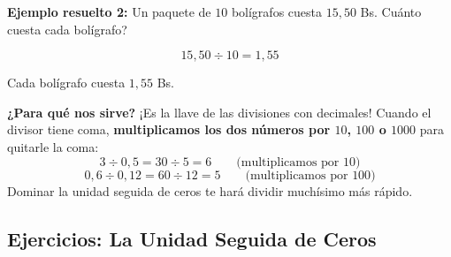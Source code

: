 \documentclass[12pt, letterpaper]{article}
\begin{document}
\noindent\textbf{Ejemplo resuelto 2:} Un paquete de $10$ bolígrafos cuesta $15{,}50$ Bs. \textquestiondown Cuánto cuesta cada bolígrafo?

\[
  15{,}50 \div 10 = 1{,}55
\]

\noindent Cada bolígrafo cuesta $1{,}55$ Bs.

\begin{cuadroadvertencia}
  \textbf{¿Para qué nos sirve?} ¡Es la llave de las divisiones con decimales! Cuando el divisor tiene coma, \textbf{multiplicamos los dos números por $10$, $100$ o $1000$} para quitarle la coma:
  \[
    3 \div 0{,}5 = 30 \div 5 = 6 \qquad \text{(multiplicamos por $10$)}
  \]
  \[
    0{,}6 \div 0{,}12 = 60 \div 12 = 5 \qquad \text{(multiplicamos por $100$)}
  \]
  Dominar la unidad seguida de ceros te hará dividir muchísimo más rápido.
\end{cuadroadvertencia}

\subsection{Ejercicios: La Unidad Seguida de Ceros}
\end{document}
